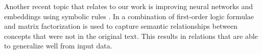 Another recent topic that relates to our work is improving neural networks and  embeddings using symbolic rules \cite{Hu2016}. In \cite{Rocktaschel2015} a combination of first-order logic formulae and matrix factorization is used to capture semantic relationships between concepts that were not in the original text. This results in relations that are able to generalize well from input data.  







